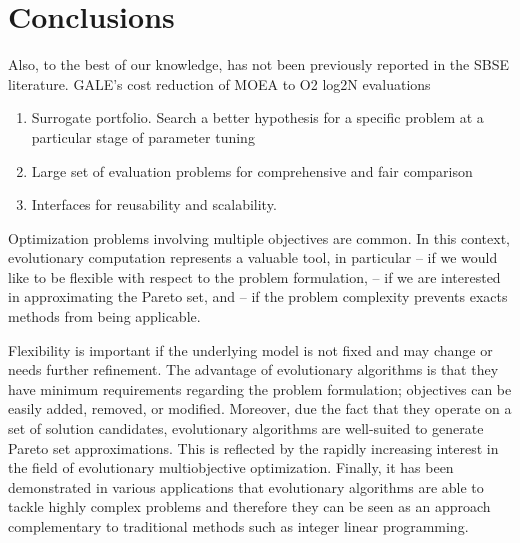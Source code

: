     \section{Conclusions}

        Also, to the best of our knowledge, has not been previously reported in the SBSE literature. GALE’s cost reduction of MOEA to O2 log2N evaluations
        
        \begin{enumerate}
            \item Surrogate portfolio. Search a better hypothesis for a specific problem at a particular stage of parameter tuning
            \item Large set of evaluation problems for comprehensive and fair comparison
            \item Interfaces for reusability and scalability. 
        \end{enumerate}


        Optimization problems involving multiple objectives are common. In this context, evolutionary computation represents a valuable tool, in particular 
        – if we would like to be flexible with respect to the problem formulation, 
        – if we are interested in approximating the Pareto set, and 
        – if the problem complexity prevents exacts methods from being applicable.

        Flexibility is important if the underlying model is not fixed and may change
        or needs further refinement. The advantage of evolutionary algorithms is that they have minimum requirements regarding the problem formulation; objectives can be easily added, removed, or modified. Moreover, due the fact that they operate on a set of solution candidates, evolutionary algorithms are well-suited to generate Pareto set approximations. This is reflected by the rapidly increasing interest in the field of evolutionary multiobjective optimization. Finally, it has been demonstrated in various applications that evolutionary algorithms are able to tackle highly complex problems and therefore they can be seen as an approach complementary to traditional methods such as integer linear programming.
